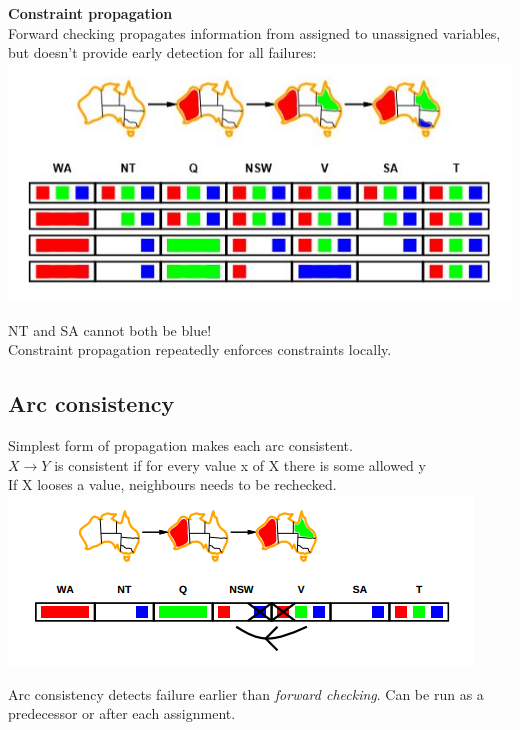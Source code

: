 \textbf{Constraint propagation}\\
Forward checking propagates information from assigned to unassigned variables, but doesn’t provide early detection for all failures: \\
\includegraphics[scale=1]{chap1_pics/backtrack4.jpeg}

NT and SA cannot both be blue!\\
Constraint propagation repeatedly enforces constraints locally.\\

\subsection{Arc consistency}
Simplest form of propagation makes each arc consistent.\\
$X \rightarrow  Y$ is consistent if for every value x of X there is some allowed y \\[3ex]
If X looses a value, neighbours needs to be rechecked.\\
\includegraphics[scale=1]{chap1_pics/arcconsistency1.png} 

Arc consistency detects failure earlier than \textit{forward checking}.
Can be run as a predecessor or after each assignment.

